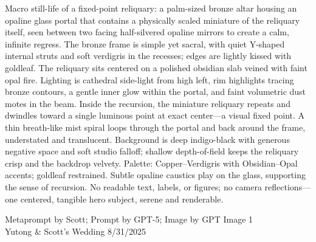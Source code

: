 \documentclass[12pt]{article}
\begin{document}
\noindent
\begin{adjustbox}{max size={\textwidth}{\textheight}}
\begin{varwidth}{\textwidth}
\RaggedRight
\footnotesize
Macro still-life of a fixed-point reliquary: a palm-sized bronze altar housing an opaline glass portal that contains a physically scaled miniature of the reliquary itself, seen between two facing half-silvered opaline mirrors to create a calm, infinite regress. The bronze frame is simple yet sacral, with quiet Y-shaped internal struts and soft verdigris in the recesses; edges are lightly kissed with goldleaf. The reliquary sits centered on a polished obsidian slab veined with faint opal fire. Lighting is cathedral side-light from high left, rim highlights tracing bronze contours, a gentle inner glow within the portal, and faint volumetric dust motes in the beam. Inside the recursion, the miniature reliquary repeats and dwindles toward a single luminous point at exact center—a visual fixed point. A thin breath-like mist spiral loops through the portal and back around the frame, understated and translucent. Background is deep indigo-black with generous negative space and soft studio falloff; shallow depth-of-field keeps the reliquary crisp and the backdrop velvety. Palette: Copper–Verdigris with Obsidian–Opal accents; goldleaf restrained. Subtle opaline caustics play on the glass, supporting the sense of recursion. No readable text, labels, or figures; no camera reflections—one centered, tangible hero subject, serene and renderable.
\end{varwidth}
\end{adjustbox}
\vfill
{\raggedleft\footnotesize
Metaprompt by Scott; Prompt by GPT-5; Image by GPT Image 1 \\
Yutong \& Scott's Wedding 8/31/2025\par}
\end{document}
